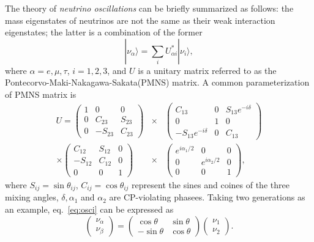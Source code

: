 The theory of \emph{neutrino oscillations} can be briefly summarized
as follows: the mass eigenstates of neutrinos are not the same as
their weak interaction eigenstates; the latter is a combination of the
former
\begin{equation}
  \label{eq:osci}
  |\nu_{\alpha}\rangle=\sum_{i}U^{*}_{\alpha i}|\nu_{i}\rangle,
\end{equation}
where $\alpha=e,\mu,\tau$, $i=1,2,3$, and $U$ is a unitary matrix
referred to as the Pontecorvo-Maki-Nakagawa-Sakata(PMNS) matrix. A
common parameterization of PMNS matrix is
\begin{eqnarray*}
  \label{eq:pmns}
  U = \left(\begin{array}{ccc}
      1 & 0 & 0 \\ 0 & C_{23} & S_{23} \\ 0 & -S_{23} & C_{23}
    \end{array}\right) &\times&
  \left(\begin{array}{ccc}
      C_{13} & 0 & S_{13}e^{-i\delta} \\ 
      0 & 1 & 0 \\ -S_{13}e^{-i\delta} & 0 & C_{13}
    \end{array}\right) \\\times
  \left(\begin{array}{ccc}
       C_{12} & S_{12} & 0 \\ -S_{12} & C_{12} & 0 \\ 0 & 0 & 1
    \end{array}\right) &\times&
  \left(\begin{array}{ccc}
      e^{i\alpha_1/2} & 0 & 0 \\ 0 & e^{i\alpha_2/2} & 0 \\ 0 & 0 & 1
    \end{array}\right),
\end{eqnarray*}
where $S_{ij} = \sin\theta_{ij}$, $C_{ij} = \cos\theta_{ij}$ represent
the sines and coines of the three mixing angles, $\delta, \alpha_1$
and $\alpha_2$ are CP-violating phasees. Taking two generations as an
example, eq.~\ref{eq:osci} can be expressed as
\begin{equation}
  \label{eq:osci2}
  \left(\begin{array}{c}\nu_{\alpha}\\\nu_{\beta}\end{array}\right)=
  \left(\begin{array}{cc} \cos\theta & \sin\theta\\
      -\sin\theta & \cos\theta \end{array}\right)
  \left(\begin{array}{c}\nu_{1}\\\nu_{2}\end{array}\right).
\end{equation}
